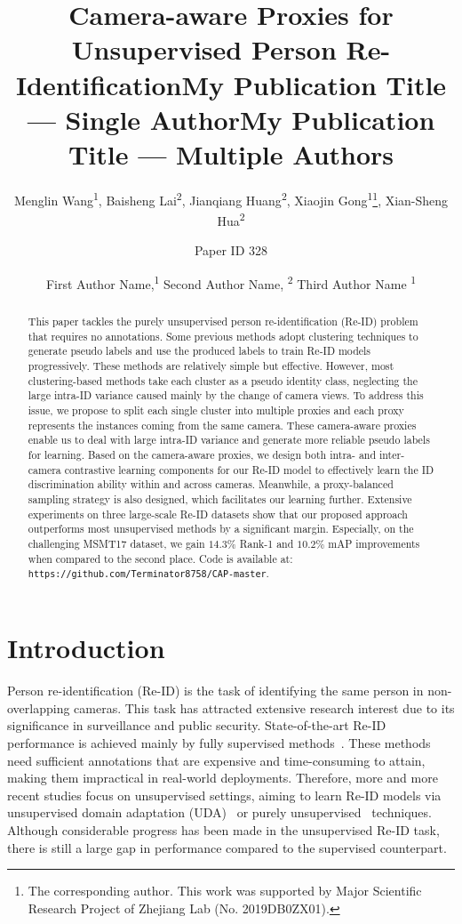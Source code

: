 \documentclass[letterpaper]{article} %
\title{Camera-aware Proxies for Unsupervised Person Re-Identification}
\author {
    Menglin Wang\textsuperscript{\rm 1}, Baisheng Lai\textsuperscript{\rm 2}, Jianqiang Huang\textsuperscript{\rm 2},
    Xiaojin Gong\textsuperscript{\rm 1}\thanks{The corresponding author. This work was supported by Major Scientific Research Project of Zhejiang Lab (No. 2019DB0ZX01).}, Xian-Sheng Hua\textsuperscript{\rm 2}
    \\
}
\title{My Publication Title --- Single Author}
\author {
    Paper ID 328
}
\title{My Publication Title --- Multiple Authors}
\author {

        First Author Name,\textsuperscript{\rm 1}
        Second Author Name, \textsuperscript{\rm 2}
        Third Author Name \textsuperscript{\rm 1} \\
}
\begin{document}

\maketitle

\begin{abstract}
This paper tackles the purely unsupervised person re-identification (Re-ID) problem that requires no annotations. Some previous methods adopt clustering techniques to generate pseudo labels and use the produced labels to train Re-ID models progressively. These methods are relatively simple but effective. However, most clustering-based methods take each cluster as a pseudo identity class, neglecting the large intra-ID variance caused mainly by the change of camera views. To address this issue, we propose to split each single cluster into multiple proxies and each proxy represents the instances coming from the same camera. These camera-aware proxies enable us to deal with large intra-ID variance and generate more reliable pseudo labels for learning. Based on the camera-aware proxies, we design both intra- and inter-camera contrastive learning components for our Re-ID model to effectively learn the ID discrimination ability within and across cameras. Meanwhile, a proxy-balanced sampling strategy is also designed, which facilitates our learning further. Extensive experiments on three large-scale Re-ID datasets show that our proposed approach outperforms most unsupervised methods by a significant margin. Especially, on the challenging MSMT17 dataset, we gain $14.3\%$ Rank-1 and $10.2\%$ mAP improvements when compared to the second place.
Code is available at: \texttt{https://github.com/Terminator8758/CAP-master}.
\end{abstract}




\section{Introduction}
Person re-identification (Re-ID) is the task of identifying the same person in non-overlapping cameras. This task has attracted extensive research interest due to its significance in surveillance and public security. State-of-the-art Re-ID performance is achieved mainly by fully supervised methods~\cite{sun2018beyond, chen2019abd}. These methods need sufficient annotations that are expensive and time-consuming to attain, making them impractical in real-world deployments. Therefore, more and more recent studies focus on unsupervised settings, aiming to learn Re-ID models via unsupervised domain adaptation (UDA)~\cite{Wei2018PTGAN,qi2019DA,zhong2019invariance} or purely unsupervised~\cite{lin2019aBottom,li2018unsupervised,wu2019graph} techniques. Although considerable progress has been made in the unsupervised Re-ID task, there is still a large gap in performance compared to the supervised counterpart.
\end{document}
